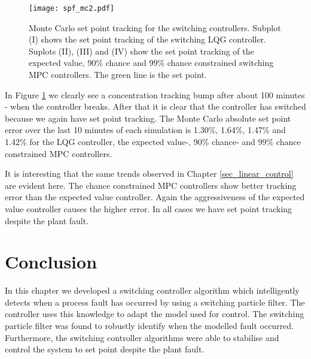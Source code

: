 \begin{figure}[H] 
\centering
\texttt{[image: spf\_mc2.pdf]}
\caption{Monte Carlo set point tracking for the switching controllers. Subplot (I) shows the set point tracking of the switching LQG controller. Suplots (II), (III) and (IV) show the set point tracking of the expected value, 90\% chance and 99\% chance constrained switching MPC controllers. The green line is the set point.}
\label{fig_spf_mc2}
\end{figure}
In Figure \ref{fig_spf_mc2} we clearly see a concentration tracking bump after about 100 minutes - when the controller breaks. After that it is clear that the controller has switched because we again have set point tracking. The Monte Carlo absolute set point error over the last 10 minutes of each simulation is 1.30\%, 1.64\%, 1.47\% and 1.42\% for the LQG controller, the expected value-, 90\% chance- and 99\% chance constrained MPC controllers. 

It is interesting that the same trends observed in Chapter \ref{sec_linear_control} are evident here. The chance constrained MPC controllers show better tracking error than the expected value controller. Again the aggressiveness of the expected value controller causes the higher error. In all cases we have set point tracking despite the plant fault.

\section{Conclusion}
In this chapter we developed a switching controller algorithm which intelligently detects when a process fault has occurred by using a switching particle filter. The controller uses this knowledge to adapt the model used for control. The switching particle filter was found to robustly identify when the modelled fault occurred. Furthermore, the switching controller algorithms were able to stabilise and control the system to set point despite the plant fault.